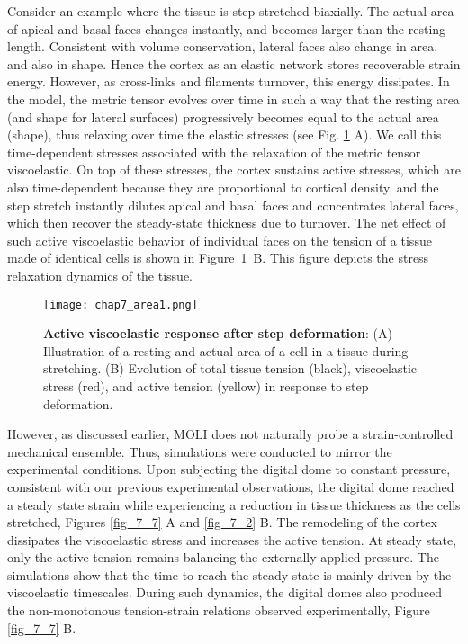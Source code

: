 Consider an example where the tissue is step stretched biaxially. The actual area of apical and basal faces  changes instantly, and becomes larger than the resting length. Consistent with volume conservation, lateral faces also change in area, and also in shape. Hence the cortex as an elastic network stores recoverable strain energy. However, as cross-links and filaments turnover, this energy dissipates. In the model, the metric tensor evolves over time in such a way that the resting area (and shape for lateral surfaces) progressively becomes equal to the actual area (shape), thus relaxing over time the elastic stresses (see Fig. \ref{fig_7_7a} A). We call this time-dependent stresses associated with the relaxation of the metric tensor viscoelastic. On top of these stresses, the cortex sustains active stresses, which are also time-dependent because they are proportional to cortical density, and the step stretch instantly dilutes apical and basal faces and concentrates lateral faces, which then recover the steady-state thickness due to turnover. The net effect of such active viscoelastic behavior of individual faces on the tension of a tissue made of identical cells is shown in  Figure~\ref{fig_7_7a}~B. This figure depicts the stress relaxation dynamics of the tissue.

\begin{figure}[b!]
	\centering
	\texttt{[image: chap7\_area1.png]}
	\caption{\label{fig_7_7a} \textbf{Active viscoelastic response after step deformation}: (A) Illustration of a resting and actual area of a cell in a tissue during stretching. (B) Evolution of total tissue tension (black), viscoelastic stress (red), and active tension (yellow) in response to step deformation.
	}
\end{figure}

However, as discussed earlier, MOLI does not naturally probe a strain-controlled mechanical ensemble. Thus,  simulations were conducted to mirror the experimental conditions. Upon subjecting the digital dome to constant pressure, consistent with our previous experimental observations, the digital dome reached a steady state strain while experiencing a reduction in tissue thickness as the cells stretched, Figures \ref{fig_7_7} A and \ref{fig_7_2} B. The remodeling of the cortex dissipates the viscoelastic stress and increases the active tension. At steady state, only the active tension remains balancing the externally applied pressure. The simulations show that the time to reach the steady state is mainly driven by the viscoelastic timescales. During such dynamics, the digital domes also produced the  non-monotonous tension-strain relations observed experimentally, Figure \ref{fig_7_7} B.

